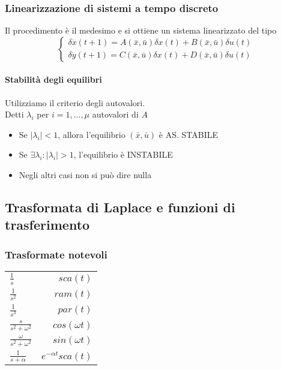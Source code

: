 \documentclass{article}
\begin{document}
	\subsubsection{Linearizzazione di sistemi a tempo discreto}
	Il procedimento è il medesimo e si ottiene un sistema linearizzato del tipo
	\begin{equation}
	\begin{cases}
	\delta\dot{x}(t+1) = A(\bar{x}, \bar{u})\delta x(t) + B(\bar{x}, \bar{u})\delta u(t) \\
	\delta\dot{y}(t+1) = C(\bar{x}, \bar{u})\delta x(t) + D(\bar{x}, \bar{u})\delta u(t)
	\end{cases}
	\end{equation}
	\paragraph{Stabilità degli equilibri}
	Utilizziamo il criterio degli autovalori.\\
	Detti $\lambda_i$ per $i=1,...,\mu$ autovalori di $A$
	\begin{itemize}
		\item Se $\left|\lambda_i\right| < 1$, allora l'equilibrio $(\bar{x}, \bar{u})$ è AS. STABILE
		\item Se $\exists \lambda_i : \left|\lambda_i\right|>1$, l'equilibrio è INSTABILE
		\item Negli altri casi non si può dire nulla
	\end{itemize}

	\newpage
	\subsection{Trasformata di Laplace e funzioni di trasferimento}
	\subsubsection{Trasformate notevoli}
	\begin{center}
		\begin{tabular}{l | r}
			$\frac{1}{s}$ & $sca(t)$ \\
			$\frac{1}{s^2}$ & $ram(t)$ \\
			$\frac{1}{s^3}$ & $par(t)$ \\
			$\frac{s}{s^2 + \omega^2}$ & $cos(\omega t)$ \\
			$\frac{\omega}{s^2 + \omega^2}$ & $sin(\omega t)$ \\
			$\frac{1}{s + \alpha}$ & $e^{-\alpha t}sca(t)$ \\
		\end{tabular}	
	\end{center}
\end{document}

